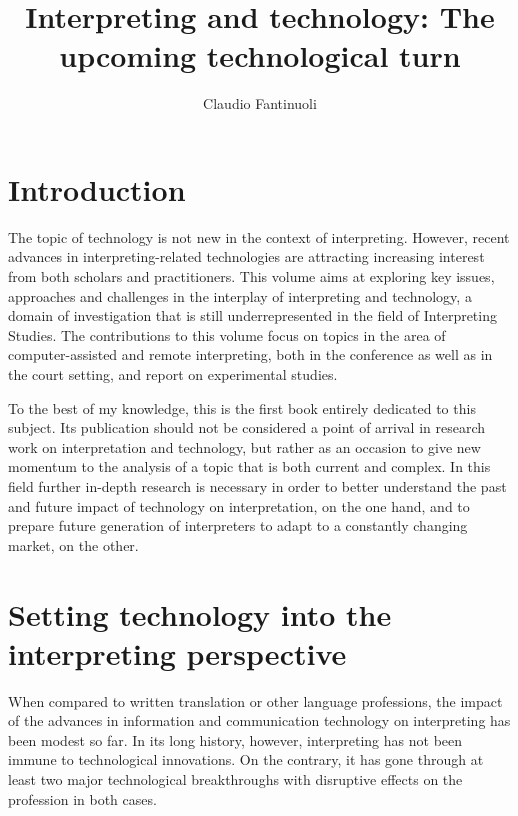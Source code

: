 \documentclass[output=paper]{langsci/langscibook}
\title{Interpreting and technology: The upcoming technological turn}
\author{Claudio Fantinuoli\affiliation{University of Mainz}}
\begin{document}
\maketitle


 

 
\section{Introduction} 
 
The topic of technology is not new in the context of interpreting. However, recent advances in interpreting-related technologies are attracting increasing interest from both scholars and practitioners. This volume aims at exploring key issues, approaches and challenges in the interplay of interpreting and technology, a domain of investigation that is still underrepresented in the field of Interpreting Studies. The contributions to this volume focus on topics in the area of computer-assisted and remote interpreting, both in the conference as well as in the court setting, and report on experimental studies.
 
To the best of my knowledge, this is the first book entirely dedicated to this subject. Its publication should not be considered a point of arrival in research work on interpretation and technology, but rather as an occasion to give new momentum to the analysis of a topic that is both current and complex. In this field further in-depth research is necessary in order to better understand the past and future impact of technology on interpretation, on the one hand, and to prepare future generation of interpreters to adapt to a constantly changing market, on the other.
 
\section{Setting technology into the interpreting perspective} 
When compared to written translation or other language professions, the impact of the advances in information and communication technology on interpreting has been modest so far. In its long history, however, interpreting has not been immune to technological innovations. On the contrary, it has gone through at least two major technological breakthroughs with disruptive effects on the profession in both cases. 
 
\end{document}
